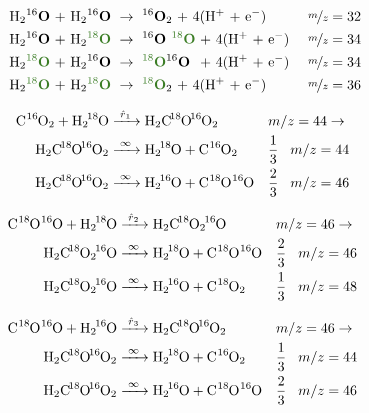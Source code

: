 \documentclass{article}
\begin{document}
\begin{align}
\text{ H$_2$\textbf{$^{16}$O} + H$_2$\textbf{$^{16}$O}  } &\rightarrow \text{ \textbf{{$^{16}$O$_2$}} + 4(H$^{+}$  + e$^{-}$) }  && \nicefrac{m}{z} = 32\\
\text{ H$_2$\textbf{$^{16}$O} + H$_2$\textbf{\textcolor{OliveGreen}{$^{18}$O}} } &\rightarrow \text{ \textbf{$^{16}$O \textcolor{OliveGreen}{$^{18}$O}} + 4(H$^{+}$  + e$^{-}$) }  && \nicefrac{m}{z} = 34\\
\text{ H$_2$\textbf{\textcolor{OliveGreen}{$^{18}$O}} + H$_2$\textbf{$^{16}$O}  } &\rightarrow \text{ \textbf{\textcolor{OliveGreen}{$^{18}$O}$^{16}$O } + 4(H$^{+}$  + e$^{-}$) }  && \nicefrac{m}{z} = 34\\
\text{ H$_2$\textbf{\textcolor{OliveGreen}{$^{18}$O}} + H$_2$\textbf{\textcolor{OliveGreen}{$^{18}$O}}  } &\rightarrow \text{ \textbf{\textcolor{OliveGreen}{$^{18}$O}}$_2$ + 4(H$^{+}$  + e$^{-}$) }  && \nicefrac{m}{z} = 36
\end{align}


\begin{align}
\ce{C^{16}O2 + H2\!^{18}O &->[\hat{r}_1] H2C\!^{18}O\!^{16}O2} && m/z=44 \rightarrow  \\
\ce{H2C\!^{18}O\!^{16}O2 &->[\infty] H2\!^{18}O + C^{16}O2} && \frac{1}{3} \hspace{3mm} m/z=44 \\
\ce{H2C\!^{18}O\!^{16}O2 &->[\infty] H2\!^{16}O + C^{18}O^{16}O } && \frac{2}{3} \hspace{3mm} m/z=46
\end{align}

\begin{align}
\ce{C^{18}O^{16}O + H2\!^{18}O &->[\hat{r}_2] H2C\!^{18}O2\!^{16}O} && m/z=46 \rightarrow \\
\ce{H2C\!^{18}O2\!^{16}O &->[\infty] H2\!^{18}O + C^{18}O^{16}O } && \frac{2}{3} \hspace{3mm} m/z=46 \\
\ce{H2C\!^{18}O2\!^{16}O &->[\infty] H2\!^{16}O + C^{18}O2} && \frac{1}{3} \hspace{3mm} m/z=48
\end{align}

\begin{align}
\ce{C^{18}O^{16}O + H2\!^{16}O &->[\hat{r}_3] H2C\!^{18}O\!^{16}O2} && m/z=46 \rightarrow \\
\ce{H2C\!^{18}O\!^{16}O2 &->[\infty] H2\!^{18}O + C^{16}O2} && \frac{1}{3} \hspace{3mm} m/z=44 \\
\ce{H2C\!^{18}O\!^{16}O2 &->[\infty] H2\!^{16}O + C^{18}O^{16}O } && \frac{2}{3} \hspace{3mm} m/z=46
\end{align}
\end{document}
